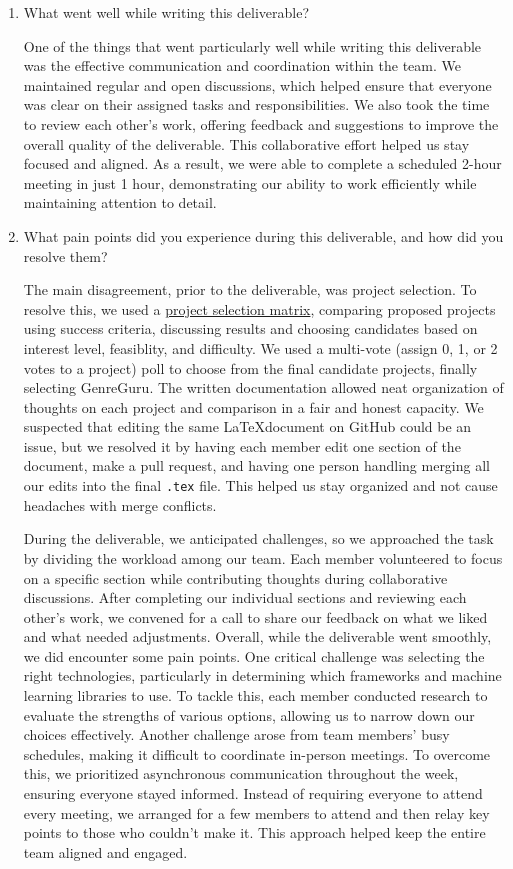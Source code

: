 \documentclass{article}
\begin{document}
\begin{enumerate}
    \item What went well while writing this deliverable?
    
    One of the things that went particularly well while writing this deliverable was the effective communication and coordination within the team. We maintained regular and open discussions, which helped ensure that everyone was clear on their assigned tasks and responsibilities. We also took the time to review each other's work, offering feedback and suggestions to improve the overall quality of the deliverable. This collaborative effort helped us stay focused and aligned. As a result, we were able to complete a scheduled 2-hour meeting in just 1 hour, demonstrating our ability to work efficiently while maintaining attention to detail.

    \item What pain points did you experience during this deliverable, and how did you resolve them?
    
    The main disagreement, prior to the deliverable, was project selection. To resolve this, we used a \href{https://github.com/AhmedAl-Hayali/GenreGuru/blob/main/docs/ProjectSelection/ProjectMatrix.md}{project selection matrix}, comparing proposed projects using success criteria, discussing results and choosing candidates based on interest level, feasiblity, and difficulty. We used a multi-vote (assign 0, 1, or 2 votes to a project) poll to choose from the final candidate projects, finally selecting GenreGuru. The written documentation allowed neat organization of thoughts on each project and comparison in a fair and honest capacity. We suspected that editing the same \LaTeX document on GitHub could be an issue, but we resolved it by having each member  edit one section of the document, make a pull request, and having one person handling merging all our edits into the final \texttt{.tex} file. This helped us stay organized and not cause headaches with merge conflicts.

    During the deliverable, we anticipated challenges, so we approached the task by dividing the workload among our team. Each member volunteered to focus on a specific section while contributing thoughts during collaborative discussions. After completing our individual sections and reviewing each other's work, we convened for a call to share our feedback on what we liked and what needed adjustments. Overall, while the deliverable went smoothly, we did encounter some pain points. One critical challenge was selecting the right technologies, particularly in determining which frameworks and machine learning libraries to use. To tackle this, each member conducted research to evaluate the strengths of various options, allowing us to narrow down our choices effectively. Another challenge arose from team members' busy schedules, making it difficult to coordinate in-person meetings. To overcome this, we prioritized asynchronous communication throughout the week, ensuring everyone stayed informed. Instead of requiring everyone to attend every meeting, we arranged for a few members to attend and then relay key points to those who couldn't make it. This approach helped keep the entire team aligned and engaged.


\end{enumerate}
\end{document}
